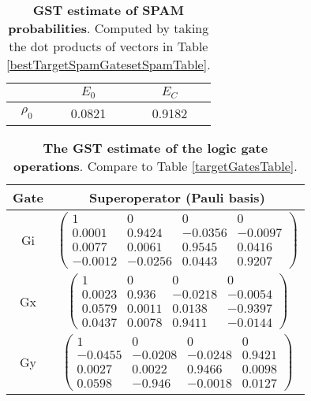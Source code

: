 {\begin{table}[h]
\begin{center}
\begin{tabular}[l]{|c|c|c|}
\hline
 & $E_{0}$ & $E_C$ \\ \hline
$\rho_{0}$ & 0.0821 & 0.9182 \\ \hline
\end{tabular}

\caption{\textbf{GST estimate of SPAM probabilities}.  Computed by taking the dot products of vectors in Table \ref{bestTargetSpamGatesetSpamTable}.\label{bestTargetSpamGatesetSpamParametersTable}}
\end{center}
\end{table}

\begin{table}[h]
\begin{center}
\begin{tabular}[l]{|c|c|}
\hline
Gate & Superoperator (Pauli basis) \\ \hline
Gi & $ \left(\!\!\begin{array}{cccc}
1 & 0 & 0 & 0 \\ 
0.0001 & 0.9424 & -0.0356 & -0.0097 \\ 
0.0077 & 0.0061 & 0.9545 & 0.0416 \\ 
-0.0012 & -0.0256 & 0.0443 & 0.9207
 \end{array}\!\!\right) $
 \\ \hline
Gx & $ \left(\!\!\begin{array}{cccc}
1 & 0 & 0 & 0 \\ 
0.0023 & 0.936 & -0.0218 & -0.0054 \\ 
0.0579 & 0.0011 & 0.0138 & -0.9397 \\ 
0.0437 & 0.0078 & 0.9411 & -0.0144
 \end{array}\!\!\right) $
 \\ \hline
Gy & $ \left(\!\!\begin{array}{cccc}
1 & 0 & 0 & 0 \\ 
-0.0455 & -0.0208 & -0.0248 & 0.9421 \\ 
0.0027 & 0.0022 & 0.9466 & 0.0098 \\ 
0.0598 & -0.946 & -0.0018 & 0.0127
 \end{array}\!\!\right) $
 \\ \hline
\end{tabular}

\caption{\textbf{The GST estimate of the logic gate operations}.  Compare to Table \ref{targetGatesTable}.\label{bestTargetSpamGatesetGatesTable}}
\end{center}
\end{table}

}
